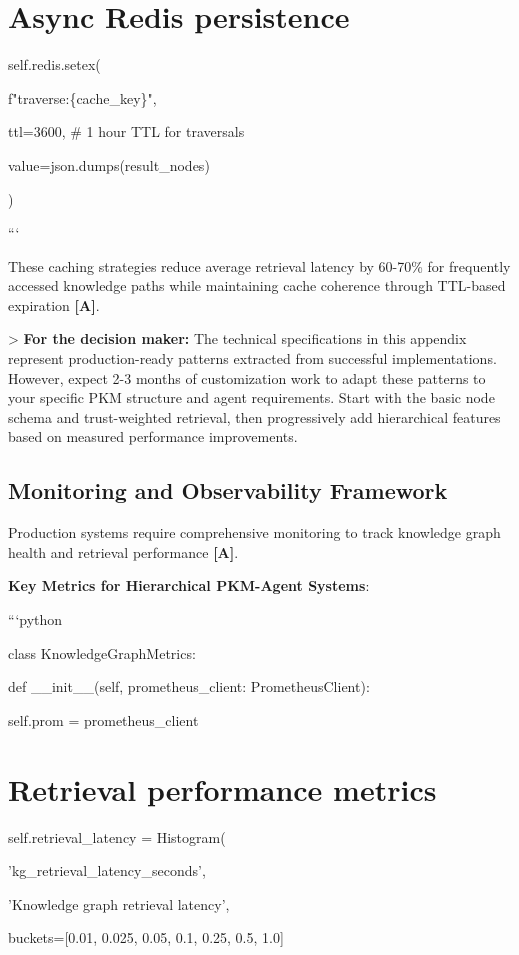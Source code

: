 \documentclass[a4paper,11pt]{article}
\newcommand{\alabel}{\textbf{\textcolor{acolor}{[A]}}}
\begin{document}
\section{Async Redis persistence}
self.redis.setex(

f"traverse:\{cache\_key\}",

ttl=3600,  \# 1 hour TTL for traversals

value=json.dumps(result\_nodes)

)

```


These caching strategies reduce average retrieval latency by 60-70\% for frequently accessed knowledge paths while maintaining cache coherence through TTL-based expiration \alabel{}.


> \textbf{For the decision maker:} The technical specifications in this appendix represent production-ready patterns extracted from successful implementations. However, expect 2-3 months of customization work to adapt these patterns to your specific PKM structure and agent requirements. Start with the basic node schema and trust-weighted retrieval, then progressively add hierarchical features based on measured performance improvements.


\subsection{Monitoring and Observability Framework}

Production systems require comprehensive monitoring to track knowledge graph health and retrieval performance \alabel{}.


\textbf{Key Metrics for Hierarchical PKM-Agent Systems}:

```python

class KnowledgeGraphMetrics:

def \_\_init\_\_(self, prometheus\_client: PrometheusClient):

self.prom = prometheus\_client


\section{Retrieval performance metrics}
self.retrieval\_latency = Histogram(

'kg\_retrieval\_latency\_seconds',

'Knowledge graph retrieval latency',

buckets=[0.01, 0.025, 0.05, 0.1, 0.25, 0.5, 1.0]
\end{document}
